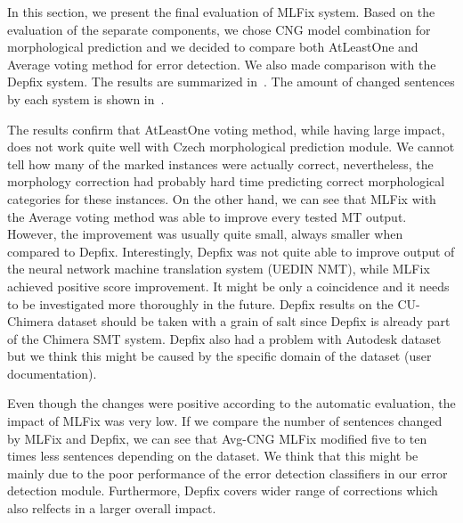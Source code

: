 In this section, we present the final evaluation of MLFix system. Based on the evaluation of the
separate components, we chose CNG model combination for morphological prediction and we
decided to compare both AtLeastOne and Average voting method for error detection. We
also made comparison with the Depfix system. The results are summarized in~.
The amount of changed sentences by each system is shown in~.

The results confirm that AtLeastOne voting method, while having large impact, does not work
quite well with Czech morphological prediction module. We cannot tell how many of the marked instances were actually
correct, nevertheless, the morphology correction had probably hard time predicting correct morphological categories
for these instances. On the other hand, we can see that MLFix with the Average voting method
was able to improve every tested MT output. However, the improvement was
usually quite small, always smaller when compared to Depfix. Interestingly,
Depfix was not quite able to improve output of the neural network machine translation system (UEDIN NMT),
while MLFix achieved positive score improvement. It might be only a coincidence and it needs to be investigated more thoroughly
in the future. Depfix results on the CU-Chimera dataset should be taken with a grain of salt since
Depfix is already part of the Chimera SMT system. Depfix also had a problem with Autodesk dataset
but we think this might be caused by the specific domain of the dataset (user documentation).

Even though the changes were positive according to the automatic evaluation, the impact of MLFix was
very low. If we compare the number of sentences changed by MLFix and Depfix, we can see that Avg-CNG MLFix
modified five to ten times less sentences depending on the dataset. We think that this might be
mainly due to the poor performance of the error detection classifiers in our error detection module.
Furthermore, Depfix covers wider range of corrections which also relfects in a larger overall impact.

